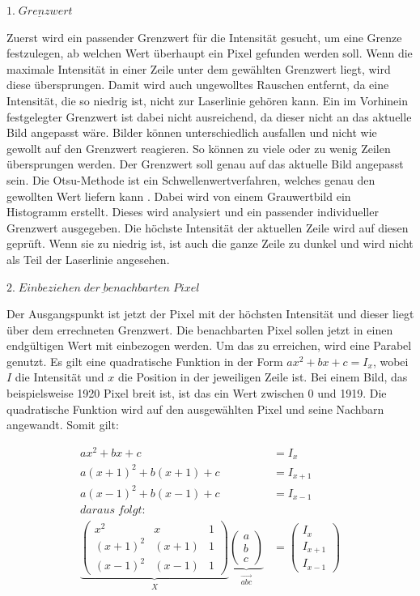 	$\underline{1. \; Grenzwert}$
	
	Zuerst wird ein passender Grenzwert für die Intensität gesucht, um eine Grenze festzulegen, ab welchen Wert überhaupt ein Pixel gefunden werden soll. Wenn die maximale Intensität in einer Zeile unter dem gewählten Grenzwert liegt, wird diese übersprungen. Damit wird auch ungewolltes Rauschen entfernt, da eine Intensität, die so niedrig ist, nicht zur Laserlinie gehören kann. Ein im Vorhinein festgelegter Grenzwert ist dabei nicht ausreichend, da dieser nicht an das aktuelle Bild angepasst wäre. Bilder können unterschiedlich ausfallen und nicht wie gewollt auf den Grenzwert reagieren. So können zu viele oder zu wenig Zeilen übersprungen werden. Der Grenzwert soll genau auf das aktuelle Bild angepasst sein. Die Otsu-Methode ist ein Schwellenwertverfahren, welches genau den gewollten Wert liefern kann \citep[vgl.][]{otsu_tresh}. Dabei wird von einem Grauwertbild ein Histogramm erstellt. Dieses wird analysiert und ein passender individueller Grenzwert ausgegeben. Die höchste Intensität der aktuellen Zeile wird auf diesen geprüft. Wenn sie zu niedrig ist, ist auch die ganze Zeile zu dunkel und wird nicht als Teil der Laserlinie angesehen.
	
	$\underline{2. \; Einbeziehen \; der \; benachbarten \; Pixel}$
	
	Der Ausgangspunkt ist jetzt der Pixel mit der höchsten Intensität und dieser liegt über dem errechneten Grenzwert. Die benachbarten Pixel sollen jetzt in einen endgültigen Wert mit einbezogen werden. Um das zu erreichen, wird eine Parabel genutzt. Es gilt eine quadratische Funktion in der Form \( ax^2 + bx + c = I_x \), wobei \( I \) die Intensität und \( x \) die Position in der jeweiligen Zeile ist. Bei einem Bild, das beispielsweise 1920 Pixel breit ist, ist das ein Wert zwischen 0 und 1919. Die quadratische Funktion wird auf den ausgewählten Pixel und seine Nachbarn angewandt. Somit gilt:
	
	\begin{equation}
	\begin{aligned}
	ax^2 + bx + c &= I_x \\
	a(x+1)^2 + b(x+1) + c &= I_{x+1} \\
	a(x-1)^2 + b(x-1) + c &= I_{x-1} \\
	daraus \; folgt: \\
	\underbrace{\begin{pmatrix}
		x^2 & x & 1 \\
		(x+1)^2 & (x+1) & 1 \\
		(x-1)^2 & (x-1) & 1 
		\end{pmatrix}}_{\substack{X}} \underbrace{ \begin{pmatrix}
		a \\
		b \\
		c
		\end{pmatrix}}_{\substack{\vec{abc}}} &= \begin{pmatrix}
	I_x \\
	I_{x+1} \\
	I_{x-1}
	\end{pmatrix}
	\end{aligned}
	\label{eq:subpixel_x}
	\end{equation}
	
